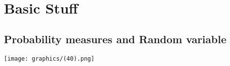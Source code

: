 \documentclass[12pt,oneside]{book}
\begin{document}
\begin{titlepage}

\end{titlepage}
\clearpage

\setmainfont{Meows}

\tableofcontents

\chapter{Basic Stuff}
\section{Probability measures and Random variable}
\begin{marginfigure}%
    \texttt{[image: graphics/(40).png]}
\end{marginfigure}%
\end{document}
